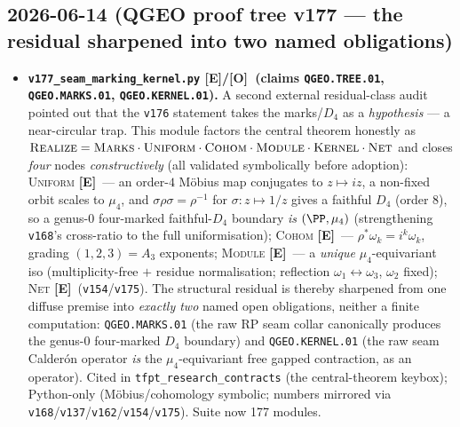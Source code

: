 \documentclass[11pt]{article}
\providecommand{\mE}{\textbf{[E]}}\providecommand{\mC}{\textbf{[C]}}
\providecommand{\mO}{\textbf{[O]}}\providecommand{\mX}{\textbf{[X]}}
\providecommand{\vref}[1]{\texttt{#1}}
\begin{document}
\subsection*{2026-06-14 (QGEO proof tree v177 --- the residual sharpened into two named obligations)}
\begin{itemize}
\item \textbf{\texttt{v177\_seam\_marking\_kernel.py} \mE/\mO\ (claims \texttt{QGEO.TREE.01},
  \texttt{QGEO.MARKS.01}, \texttt{QGEO.KERNEL.01}).} A second external residual-class audit pointed
  out that the \vref{v176} statement takes the marks/$D_4$ as a \emph{hypothesis} --- a near-circular
  trap. This module factors the central theorem honestly as
  $\textsc{Realize}=\textsc{Marks}\cdot\textsc{Uniform}\cdot\textsc{Cohom}\cdot\textsc{Module}\cdot
  \textsc{Kernel}\cdot\textsc{Net}$ and closes \emph{four} nodes \emph{constructively} (all validated
  symbolically before adoption): \textsc{Uniform} \mE\ --- an order-$4$ M\"obius map conjugates to
  $z\mapsto iz$, a non-fixed orbit scales to $\mu_4$, and $\sigma\rho\sigma=\rho^{-1}$ for
  $\sigma:z\mapsto1/z$ gives a faithful $D_4$ (order $8$), so a genus-$0$ four-marked faithful-$D_4$
  boundary \emph{is} $(\PP,\mu_4)$ (strengthening \vref{v168}'s cross-ratio to the full
  uniformisation); \textsc{Cohom} \mE\ --- $\rho^*\omega_k=i^k\omega_k$, grading $(1,2,3)=A_3$
  exponents; \textsc{Module} \mE\ --- a \emph{unique} $\mu_4$-equivariant iso (multiplicity-free $+$
  residue normalisation; reflection $\omega_1\!\leftrightarrow\!\omega_3$, $\omega_2$ fixed);
  \textsc{Net} \mE\ (\vref{v154}/\vref{v175}). The structural residual is thereby sharpened from one
  diffuse premise into \emph{exactly two} named open obligations, neither a finite computation:
  \texttt{QGEO.MARKS.01} (the raw RP seam collar canonically produces the genus-$0$ four-marked $D_4$
  boundary) and \texttt{QGEO.KERNEL.01} (the raw seam Calder\'on operator \emph{is} the
  $\mu_4$-equivariant free gapped contraction, as an operator). Cited in
  \texttt{tfpt\_research\_contracts} (the central-theorem keybox); Python-only (M\"obius/cohomology
  symbolic; numbers mirrored via \vref{v168}/\vref{v137}/\vref{v162}/\vref{v154}/\vref{v175}). Suite
  now 177 modules.
\end{itemize}
\end{document}
